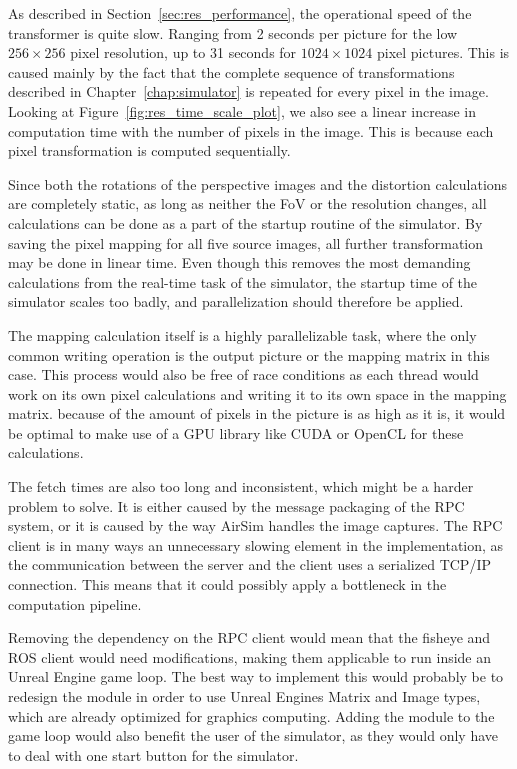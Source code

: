 As described in Section~\ref{sec:res_performance}, the operational speed of the transformer is quite slow. Ranging from 2 seconds per picture for the low $256\times 256$ pixel resolution, up to 31 seconds for $1024 \times 1024$ pixel pictures. This is caused mainly by the fact that the complete sequence of transformations described in Chapter~\ref{chap:simulator} is repeated for every pixel in the image. Looking at Figure~\ref{fig:res_time_scale_plot}, we also see a linear increase in computation time with the number of pixels in the image. This is because each pixel transformation is computed sequentially.

Since both the rotations of the perspective images and the distortion calculations are completely static, as long as neither the FoV or the resolution changes, all calculations can be done as a part of the startup routine of the simulator. By saving the pixel mapping for all five source images, all further transformation may be done in linear time. Even though this removes the most demanding calculations from the real-time task of the simulator, the startup time of the simulator scales too badly, and parallelization should therefore be applied.

The mapping calculation itself is a highly parallelizable task, where the only common writing operation is the output picture or the mapping matrix in this case. This process would also be free of race conditions as each thread would work on its own pixel calculations and writing it to its own space in the mapping matrix. because of the amount of pixels in the picture is as high as it is, it would be optimal to make use of a GPU library like CUDA or OpenCL for these calculations.

The fetch times are also too long and inconsistent, which might be a harder problem to solve. It is either caused by the message packaging of the RPC system, or it is caused by the way AirSim handles the image captures. The RPC client is in many ways an unnecessary slowing element in the implementation, as the communication between the server and the client uses a serialized TCP/IP connection. This means that it could possibly apply a bottleneck in the computation pipeline.

Removing the dependency on the RPC client would mean that the fisheye and ROS client would need modifications, making them applicable to run inside an Unreal Engine game loop. The best way to implement this would probably be to redesign the module in order to use Unreal Engines Matrix and Image types, which are already optimized for graphics computing. Adding the module to the game loop would also benefit the user of the simulator, as they would only have to deal with one start button for the simulator. 


\cleardoublepage